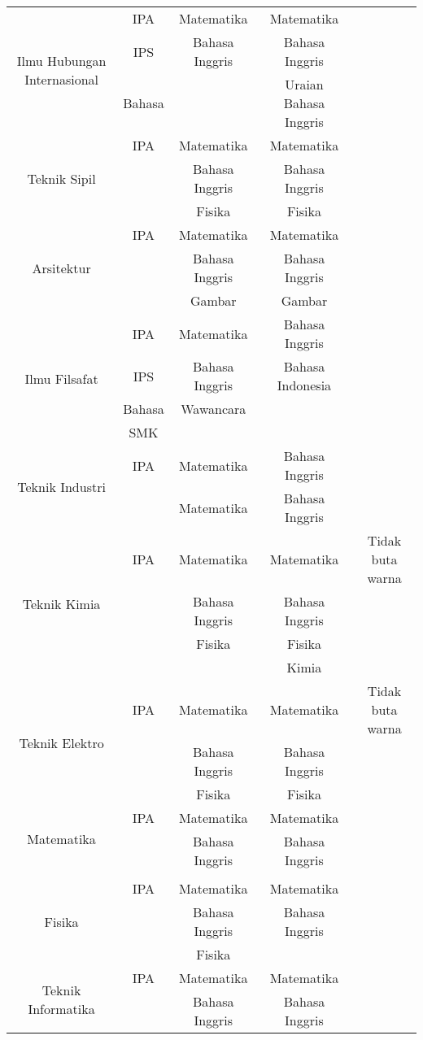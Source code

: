 \begin{table}[H]
\begin{tabular}{| c | c | c | c | c |}
		\hline
		\multirow{3}{10em}{Ilmu Hubungan Internasional} & IPA & Matematika & Matematika & \\
		& IPS & Bahasa Inggris & Bahasa Inggris & \\
		& Bahasa & & Uraian Bahasa Inggris & \\
		
		\hline
		\multirow{3}{10em}{Teknik Sipil} & IPA & Matematika & Matematika & \\
		& & Bahasa Inggris & Bahasa Inggris & \\
		& & Fisika & Fisika & \\
		
		\hline
		\multirow{3}{10em}{Arsitektur} & IPA & Matematika & Matematika & \\
		& & Bahasa Inggris & Bahasa Inggris & \\
		& & Gambar & Gambar & \\
		
		\hline
		\multirow{4}{10em}{Ilmu Filsafat} & IPA & Matematika & Bahasa Inggris & \\
		& IPS & Bahasa Inggris & Bahasa Indonesia & \\
		& Bahasa & Wawancara & & \\
		& SMK & & & \\
		
		\hline
		\multirow{2}{10em}{Teknik Industri} & IPA & Matematika & Bahasa Inggris & \\
		& & Matematika & Bahasa Inggris & \\
		
		\hline
		\multirow{4}{10em}{Teknik Kimia} & IPA & Matematika & Matematika & Tidak buta warna\\
		& & Bahasa Inggris & Bahasa Inggris & \\
		& & Fisika & Fisika & \\
		& & & Kimia & \\
		
		\hline
		\multirow{3}{10em}{Teknik Elektro} & IPA & Matematika & Matematika & Tidak buta warna \\
		& & Bahasa Inggris & Bahasa Inggris & \\
		& & Fisika & Fisika & \\
		
		\hline
		\multirow{2}{10em}{Matematika} & IPA & Matematika & Matematika & \\
		& & Bahasa Inggris & Bahasa Inggris & \\
		& & & & \\
		
		\hline
		\multirow{3}{10em}{Fisika} & IPA & Matematika & Matematika & \\
		& & Bahasa Inggris & Bahasa Inggris & \\
		& & Fisika & & \\
		
		\hline
		\multirow{2}{10em}{Teknik Informatika} & IPA & Matematika & Matematika & \\
		& & Bahasa Inggris & Bahasa Inggris & \\
		
		\hline
	\end{tabular} 
\end{table}

